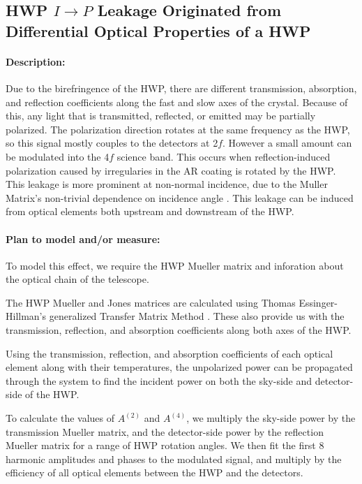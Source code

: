 
\subsection{HWP $I \rightarrow P$ Leakage Originated from Differential Optical Properties of a HWP}
\label{HWP Differential Optical Properties}

\paragraph{Description:}
Due to the birefringence of the HWP, there are different transmission, absorption, and reflection coefficients along the fast and slow axes of the crystal. Because of this, any light that is transmitted, reflected, or emitted may be partially polarized. The polarization direction rotates at the same frequency as the HWP, so this signal mostly couples to the detectors at 2$f$.
However a small amount can be modulated into the 4$f$ science band. This occurs when reflection-induced polarization caused by irregularies in the AR coating is rotated by the HWP. This leakage is more prominent at non-normal incidence, due to the Muller Matrix's non-trivial dependence on incidence angle \cite{Essinger-Hileman2013, Essinger-Hileman2016, ABS_HWP}.  This leakage can be induced from optical elements both upstream and downstream of the HWP.

\paragraph{Plan to model and/or measure:}
To model this effect, we require the HWP Mueller matrix and inforation about the optical chain of the telescope.

The HWP Mueller and Jones matrices are calculated using Thomas Essinger-Hillman's generalized Transfer Matrix Method \cite{Essinger-Hileman2013}.
These also provide us with the transmission, reflection, and absorption coefficients along both axes of the HWP.

Using the transmission, reflection, and absorption coefficients of each optical element along with their temperatures, the unpolarized power can be propagated through the system to find the incident power on both the sky-side and detector-side of the HWP.

To calculate the values of $A^{(2)}$ and $A^{(4)}$, we multiply the sky-side power by the transmission Mueller matrix, and the detector-side power by the reflection Mueller matrix for a range of HWP rotation angles. 
We then fit the first 8 harmonic amplitudes and phases to the modulated signal, and multiply by the efficiency of all optical elements between the HWP and the detectors. 


